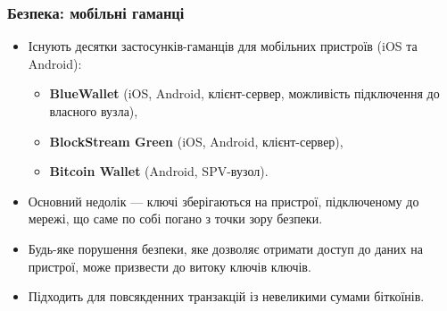 \documentclass{beamer}
\begin{document}
\begin{frame}
  \frametitle{Безпека: мобільні гаманці}
  \begin{itemize}
  \item Існують десятки застосунків-гаманців для мобільних пристроїв (iOS та
    Android):
    \begin{itemize}
    \item \textbf{BlueWallet} (iOS, Android, клієнт-сервер, можливість
      підключення до власного вузла),
    \item \textbf{BlockStream Green} (iOS, Android, клієнт-сервер),
    \item \textbf{Bitcoin Wallet} (Android, SPV-вузол).
    \end{itemize}
  \item Основний недолік — ключі зберігаються на пристрої, підключеному до
    мережі, що саме по собі погано з точки зору безпеки.
  \item Будь-яке порушення безпеки, яке дозволяє отримати доступ до даних на
    пристрої, може призвести до витоку ключів ключів.
  \item Підходить для повсякденних транзакцій із невеликими сумами біткоїнів.
  \end{itemize}
\end{frame}
\end{document}
